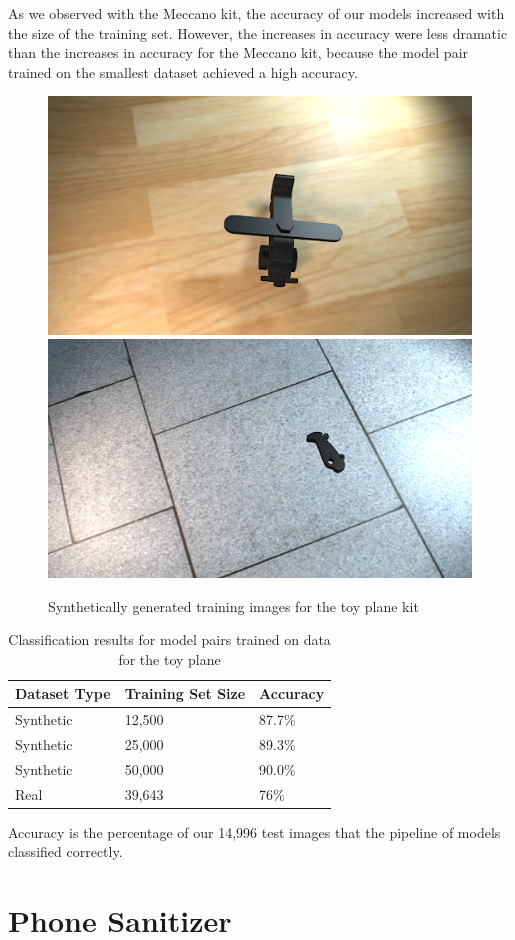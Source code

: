 As we observed with the Meccano kit, the accuracy of our models increased with
the size of the training set.
However, the increases in accuracy were less dramatic than the increases in
accuracy for the Meccano kit, because the model pair trained on the smallest
dataset achieved a high accuracy.

\begin{figure}
  \includegraphics[width=0.5\columnwidth]{figures/synthetic/plane_train1.png}
  \includegraphics[width=0.5\columnwidth]{figures/synthetic/plane_train2.png}
  \caption{
    Synthetically generated training images for the toy plane kit
  }\label{fig:plane_train}
\end{figure}

\begin{table}
\begin{tabular}{|l||l|l|}
\hline
  Dataset Type & Training Set Size & Accuracy\\
  \hline
  \hline
  Synthetic & 12,500 & 87.7\%\\
  Synthetic & 25,000 & 89.3\%\\
  Synthetic & 50,000 & 90.0\%\\
  \hline
  Real & 39,643 & 76\%\\
\hline
\end{tabular}
\begin{captiontext}
    Accuracy is the percentage of our 14,996 test images that the pipeline of
    models classified correctly.
  \end{captiontext}
  \caption{
    Classification results for model pairs trained on data for the toy plane
  }\label{tab:plane_accuracy}
\end{table}

\section{Phone Sanitizer}

